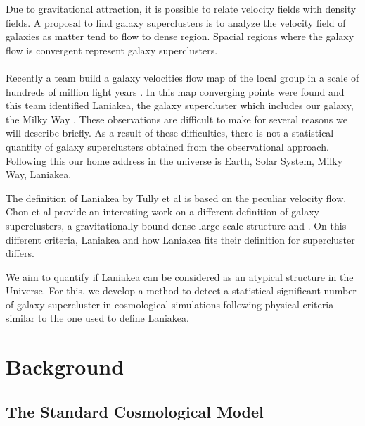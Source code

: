 \documentclass[12pt]{article}
\begin{document}
Due to gravitational attraction, it is possible to relate
  velocity fields with density fields. A proposal to
   find galaxy superclusters is to analyze the
    velocity field of galaxies as matter tend to flow to
     dense region. Spacial
      regions where the galaxy flow is convergent
       represent galaxy superclusters.\\
\\
Recently a team build a galaxy velocities flow map
 of the local group in a scale of hundreds of million light
  years \cite{tully_cosmicflows-2_2013}. In this map
   converging points were found and this team
    identified Laniakea, the galaxy supercluster
     which includes our galaxy, the Milky Way
      \cite{tully_laniakea_2014}. These observations
       are difficult to make for several reasons we
        will describe briefly. As a result of these
         difficulties, there is not a statistical
          quantity of galaxy superclusters obtained
           from the observational approach. Following
            this our home address in the universe is
             Earth, Solar System, Milky Way, Laniakea.
\\   
\begin{par}
The definition of Laniakea by Tully et al
 \cite{tully_laniakea_2014} is based on the
  peculiar velocity flow. Chon et al provide an
   interesting work on a different definition of
    galaxy superclusters, a gravitationally bound
     dense large scale structure
      \cite{chon_characterising_2014} and
       \cite{chon_definition_2015}. On this
        different criteria, Laniakea and how
         Laniakea fits their definition for supercluster
          differs.  \\
\end{par}
We aim to quantify if Laniakea can be
 considered as an atypical structure in
the Universe. For this, we develop a method to detect a
 statistical significant number of galaxy
supercluster in cosmological simulations following
 physical criteria similar to the one used to define
  Laniakea. 
\\

\section{Background}
\subsection{The Standard Cosmological Model}
\label{cosmo_constants}
\end{document}
